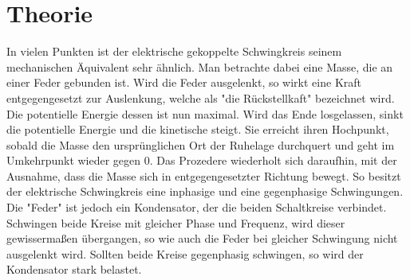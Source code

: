 \section{Theorie}
\label{sec:Theorie}

In vielen Punkten ist der elektrische gekoppelte Schwingkreis seinem mechanischen Äquivalent sehr ähnlich. Man betrachte dabei eine Masse, die an einer Feder gebunden ist. Wird die Feder ausgelenkt, so wirkt eine Kraft entgegengesetzt zur Auslenkung, welche als "die Rückstellkaft" bezeichnet wird. Die potentielle Energie dessen ist nun maximal. Wird das Ende losgelassen, sinkt die potentielle Energie und die kinetische steigt. Sie erreicht ihren Hochpunkt, sobald die Masse den ursprünglichen Ort der Ruhelage durchquert und geht im Umkehrpunkt wieder gegen 0. Das Prozedere wiederholt sich daraufhin, mit der Ausnahme, dass die Masse sich in entgegengesetzter Richtung bewegt.
So besitzt der elektrische Schwingkreis eine inphasige       und eine gegenphasige Schwingungen. 
Die "Feder" ist jedoch ein Kondensator, der die beiden Schaltkreise verbindet.
Schwingen beide Kreise mit gleicher Phase und Frequenz, wird dieser gewissermaßen übergangen, so wie auch die Feder bei gleicher Schwingung nicht ausgelenkt wird.
Sollten beide Kreise gegenphasig schwingen, so wird der Kondensator stark belastet.
